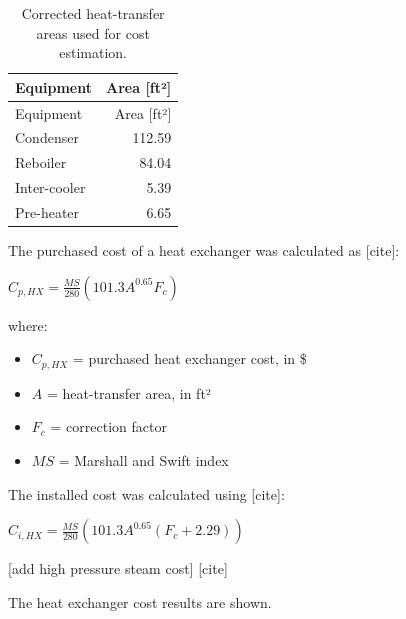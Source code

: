 \begin{longtable}[]{@{}lr@{}}
\caption{Corrected heat-transfer areas used for cost estimation.
\label{tab:Corrected heat-transfer areas used for cost estimation.}}\tabularnewline
\toprule\noalign{}
Equipment & Area {[}ft²{]} \\
\midrule\noalign{}
\endfirsthead
\toprule\noalign{}
Equipment & Area {[}ft²{]} \\
\midrule\noalign{}
\endhead
\bottomrule\noalign{}
\endlastfoot
Condenser & 112.59 \\
Reboiler & 84.04 \\
Inter-cooler & 5.39 \\
Pre-heater & 6.65 \\
\end{longtable}

The purchased cost of a heat exchanger was calculated as {[}cite{]}:

\(C_{p,HX} = \frac{MS}{280} \left(101.3 A^{0.65} F_c \right)\)

where:

\begin{itemize}
\tightlist
\item
  \(C_{p,HX}\) = purchased heat exchanger cost, in \$
\item
  \(A\) = heat-transfer area, in ft²
\item
  \(F_c\) = correction factor
\item
  \(MS\) = Marshall and Swift index
\end{itemize}

The installed cost was calculated using {[}cite{]}:

\(C_{i,HX} = \frac{MS}{280} \left(101.3 A^{0.65}(F_c + 2.29)\right)\)

{[}add high pressure steam cost{]} {[}cite{]}

The heat exchanger cost results are shown.


